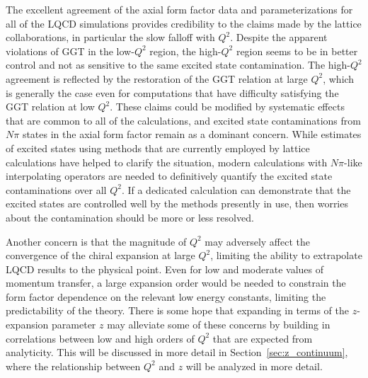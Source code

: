 The excellent agreement of the axial form factor data and parameterizations
 for all of the LQCD simulations provides credibility to the claims
 made by the lattice collaborations, in particular the slow falloff with $Q^2$.
Despite the apparent violations of GGT in the low-$Q^2$ region,
 the high-$Q^2$ region seems to be in better control and not as sensitive to
 the same excited state contamination.
The high-$Q^2$ agreement is reflected by the restoration of the GGT relation at large $Q^2$,
 which is generally the case even for computations that have difficulty satisfying
 the GGT relation at low $Q^2$.
These claims could be modified by systematic effects
 that are common to all of the calculations,
 and excited state contaminations from $N\pi$ states in
 the axial form factor remain as a dominant concern.
While estimates of excited states using methods that are currently employed
 by lattice calculations have helped to clarify the situation,
 modern calculations with $N\pi$-like interpolating operators
 are needed to definitively quantify the excited state contaminations over all $Q^2$.
If a dedicated calculation can demonstrate that the
 excited states are controlled well by the methods presently in use,
 then worries about the contamination should be more or less resolved.

Another concern is that the magnitude of $Q^2$ may adversely affect
 the convergence of the chiral expansion at large $Q^2$,
 limiting the ability to extrapolate LQCD results to the physical point.
Even for low and moderate values of momentum transfer,
 a large expansion order would be needed to constrain the form factor
 dependence on the relevant low energy constants,
 limiting the predictability of the theory.
There is some hope that expanding in terms of the $z$-expansion parameter $z$
 may alleviate some of these concerns by building in correlations between
 low and high orders of $Q^2$ that are expected from analyticity.
This will be discussed in more detail in Section~\ref{sec:z_continuum},
 where the relationship between $Q^2$ and $z$ will be analyzed in more detail.

